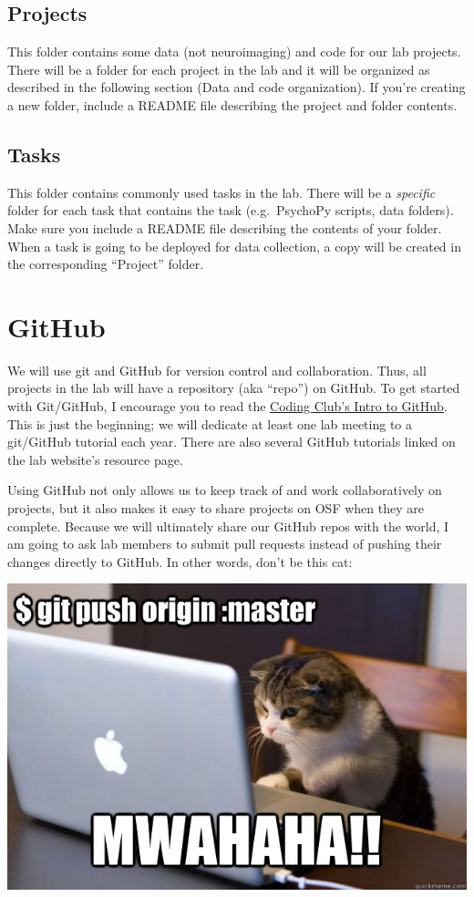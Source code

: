 \documentclass[]{book}
\begin{document}
\hypertarget{projects}{%
\subsection{Projects}\label{projects}}

This folder contains some data (not neuroimaging) and code for our lab projects. There will be a folder for each project in the lab and it will be organized as described in the following section (Data and code organization). If you're creating a new folder, include a README file describing the project and folder contents.

\hypertarget{tasks}{%
\subsection{Tasks}\label{tasks}}

This folder contains commonly used tasks in the lab. There will be a \emph{specific} folder for each task that contains the task (e.g.~PsychoPy scripts, data folders). Make sure you include a README file describing the contents of your folder. When a task is going to be deployed for data collection, a copy will be created in the corresponding ``Project'' folder.

\hypertarget{github}{%
\section{GitHub}\label{github}}

We will use git and GitHub for version control and collaboration. Thus, all projects in the lab will have a repository (aka ``repo'') on GitHub. To get started with Git/GitHub, I encourage you to read the \href{https://ourcodingclub.github.io/2017/02/27/git.html}{Coding Club's Intro to GitHub}. This is just the beginning; we will dedicate at least one lab meeting to a git/GitHub tutorial each year. There are also several GitHub tutorials linked on the lab website's resource page.

Using GitHub not only allows us to keep track of and work collaboratively on projects, but it also makes it easy to share projects on OSF when they are complete. Because we will ultimately share our GitHub repos with the world, I am going to ask lab members to submit pull requests instead of pushing their changes directly to GitHub. In other words, don't be this cat:

\includegraphics{images/github.png}
\end{document}
